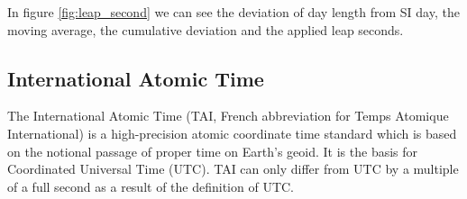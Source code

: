 In figure \ref{fig:leap_second} we can see the deviation of day length from SI day, the moving average, the cumulative deviation and the applied leap seconds.

\subsection{International Atomic Time}

The International Atomic Time (TAI, French abbreviation for Temps Atomique International) is a high-precision atomic coordinate time standard which is based on the notional passage of proper time on Earth’s geoid. It is the basis for Coordinated Universal Time (UTC). TAI can only differ from UTC by a multiple of a full second as a result of the definition of UTC.

